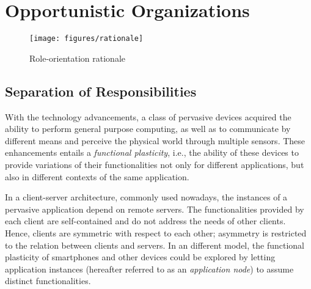 \section{Opportunistic Organizations}\label{sec:edge_spaces}

\begin{figure*}[t!]
	\centering
	\texttt{[image: figures/rationale]}
	\caption{Role-orientation rationale}
	\label{fig:rationale}
\end{figure*}


\subsection{Separation of Responsibilities}

With the technology advancements, a class of pervasive devices acquired the ability to perform general purpose computing, as well as to communicate by different means and perceive the physical world through multiple sensors. These enhancements entails a \textit{functional plasticity}, i.e., the ability of these devices to provide variations of their functionalities not only for different applications, but also in different contexts of the same application. 

In a client-server architecture, commonly used nowadays, the instances of a pervasive application depend on remote servers. The functionalities provided by each client are self-contained and do not address the needs of other clients. Hence, clients are symmetric with respect to each other; asymmetry is restricted to the relation between clients and servers. 
In an different model, the functional plasticity of smartphones and other devices could be explored by letting application instances (hereafter referred to as an \textit{application node}) to assume distinct functionalities.



